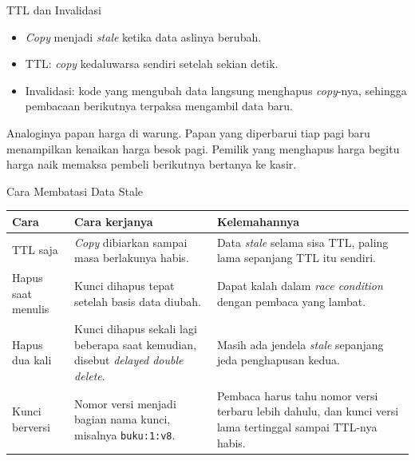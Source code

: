 \documentclass[aspectratio=169, table, 12pt]{beamer}
\begin{document}
\begin{frame}{{\Large TTL dan Invalidasi}}
  \vspace{10pt}
  \begin{itemize}
    \item \textit{Copy} menjadi \textit{stale} ketika data aslinya berubah.
    \item TTL: \textit{copy} kedaluwarsa sendiri setelah sekian detik.
    \item Invalidasi: kode yang mengubah data langsung menghapus \textit{copy}-nya,
          sehingga pembacaan berikutnya terpaksa mengambil data baru.
  \end{itemize}
  \vspace{8pt}
  {\footnotesize Analoginya papan harga di warung. Papan yang diperbarui tiap
  pagi baru menampilkan kenaikan harga besok pagi. Pemilik yang menghapus harga
  begitu harga naik memaksa pembeli berikutnya bertanya ke kasir.}
\end{frame}

\begin{frame}{{\Large Cara Membatasi Data Stale}}
  \vspace{4pt}
  \centering
  {\scriptsize
  \begin{tabularx}{\textwidth}{lYY}
    \hline
    \textbf{Cara} & \textbf{Cara kerjanya} & \textbf{Kelemahannya} \\
    \hline
    TTL saja & \textit{Copy} dibiarkan sampai masa berlakunya habis. & Data \textit{stale} selama sisa TTL, paling lama sepanjang TTL itu sendiri. \\
    \hline
    Hapus saat menulis & Kunci dihapus tepat setelah basis data diubah. & Dapat kalah dalam \textit{race condition} dengan pembaca yang lambat. \\
    \hline
    Hapus dua kali & Kunci dihapus sekali lagi beberapa saat kemudian, disebut \textit{delayed double delete}. & Masih ada jendela \textit{stale} sepanjang jeda penghapusan kedua. \\
    \hline
    Kunci berversi & Nomor versi menjadi bagian nama kunci, misalnya \texttt{buku:1:v8}. & Pembaca harus tahu nomor versi terbaru lebih dahulu, dan kunci versi lama tertinggal sampai TTL-nya habis. \\
    \hline
  \end{tabularx}}
\end{frame}
\end{document}
